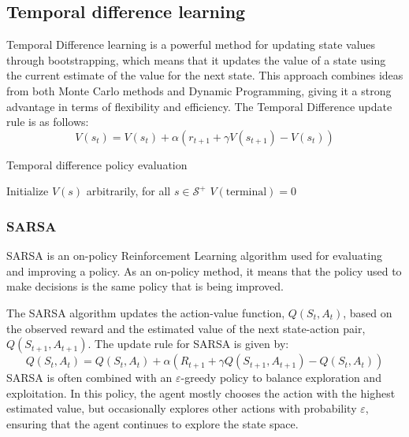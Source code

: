 \subsection{Temporal difference learning}
Temporal Difference learning is a powerful method for updating state values through bootstrapping, which means that it updates the value of a state using the current estimate of the value for the next state. 
This approach combines ideas from both Monte Carlo methods and Dynamic Programming, giving it a strong advantage in terms of flexibility and efficiency.
The Temporal Difference update rule is as follows:
\[V(s_t) = V(s_t)+\alpha(r_{t+1}+\gamma V(s_{t+1})-V(s_t))\]
\begin{algorithm}[H]
    \caption{Temporal difference policy evaluation}
        \begin{algorithmic}[1]
            \State Initialize $V(s)$ arbitrarily, for all $s\in\mathcal{S}^{+}$
            \State $V(\text{terminal})=0$
            \EndFor
        \end{algorithmic}
\end{algorithm}
    
\subsubsection{SARSA}
SARSA is an on-policy Reinforcement Learning algorithm used for evaluating and improving a policy. 
As an on-policy method, it means that the policy used to make decisions is the same policy that is being improved.

The SARSA algorithm updates the action-value function, $Q(S_t,A_t)$, based on the observed reward and the estimated value of the next state-action pair, $Q(S_{t+1},A_{t+1})$. 
The update rule for SARSA is given by:
\[Q(S_t,A_t)=Q(S_t,A_t)+\alpha(R_{t+1}+\gamma Q(S_{t+1},A_{t+1})-Q(S_t,A_t))\]
SARSA is often combined with an $\varepsilon$-greedy policy to balance exploration and exploitation. 
In this policy, the agent mostly chooses the action with the highest estimated value, but occasionally explores other actions with probability $\varepsilon$, ensuring that the agent continues to explore the state space.

